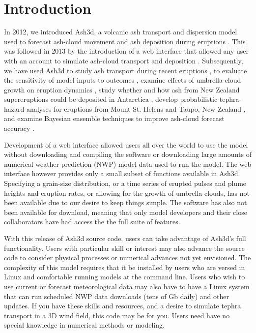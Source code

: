 \chapter{Introduction}\label{ChapIntro}
In 2012, we introduced Ash3d, a volcanic ash transport and dispersion model
used to forecast ash-cloud movement and ash deposition during eruptions \cite{Schwaiger12}.
This was followed in 2013 by the introduction of a web interface that allowed any user
with an account to simulate ash-cloud transport and deposition \cite{Mastin13b}.
Subsequently, we have used Ash3d to study ash transport during recent
eruptions \cite{Mastin13a}, to evaluate the sensitivity of model inputs to
outcomes \cite{Mastin16}, examine effects of umbrella-cloud growth on eruption
dynamics \cite{Mastin14,Mastin20a},  study whether and how ash from New Zealand
supereruptions could be deposited in Antarctica \cite{Dunbar17}, develop
probabilistic tephra-hazard analyses for eruptions from Mount St. Helens \cite{Mastin20b}
and Taupo, New Zealand \cite{Barker19}, and examine Bayesian ensemble techniques
to improve ash-cloud forecast accuracy \cite{Denlinger12}.

Development of a web interface allowed users all over the world to use the model
without downloading and compiling the software or downloading large amounts of
numerical weather prediction (NWP) model data used to run the model.  The web
interface however provides only a small subset of functions available in Ash3d.
Specifying a grain-size distribution, or a time series of erupted pulses and
plume heights and eruption rates, or allowing for the growth of umbrella clouds,
has not been available due to our desire to keep things simple.  The software has
also not been available for download, meaning that only model developers and their
close collaborators have had access the the full suite of features.

With this release of Ash3d source code, users can take advantage of Ash3d's full
functionality.  Users with particular skill or interest may also advance the
source code to consider physical processes or numerical advances not yet envisioned.
The complexity of this model requires that it be installed by users who are versed
in Linux and comfortable running models at the command line.  Users who wish to use
current or forecast meteorological data may also have to have a Linux system that
can run scheduled NWP data downloads (tens of Gb daily) and other updates.  If you
have these skills and resources, and a desire to simulate tephra transport in a 3D
wind field, this code may be for you. Users need have no special knowledge in
numerical methods or modeling.

